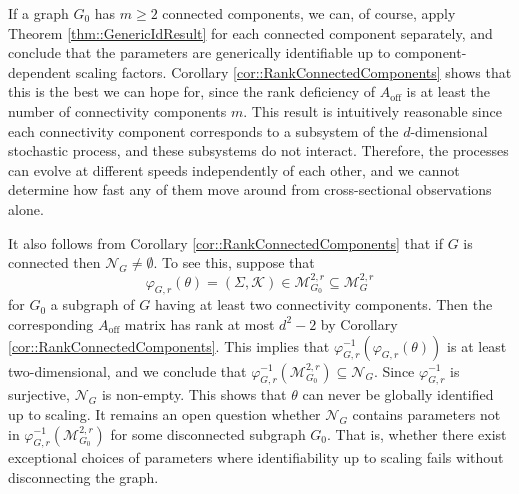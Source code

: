 \documentclass{biometrika}
\begin{document}
If a graph $G_0$ has $m \geq 2$ connected components, we can, of course,  
apply Theorem \ref{thm::GenericIdResult} for each connected component separately, 
and conclude that the parameters are generically identifiable up to component-dependent 
scaling factors. Corollary \ref{cor::RankConnectedComponents} shows that this is the 
best we can hope for, since the rank deficiency of $A_{\mathrm{off}}$ is at least the 
number of connectivity components $m$. This result is intuitively reasonable since 
each connectivity component corresponds to a subsystem of the $d$-dimensional stochastic process,
and these subsystems do not interact. Therefore, the processes can evolve
at different speeds independently of each other, and we cannot determine how fast
any of them move around from cross-sectional observations alone. 

It also follows from Corollary \ref{cor::RankConnectedComponents} that 
if $G$ is connected then $\mathcal{N}_G \neq \emptyset$. To see this, suppose that 
$$\varphi_{G,r}(\theta) = (\Sigma, \mathcal{K} ) \in \mathcal{M}^{2,r}_{G_0} \subseteq \mathcal{M}^{2,r}_{G}$$ 
for $G_0$ a subgraph of $G$ having at least two connectivity components. Then the 
corresponding $A_{\mathrm{off}}$ matrix has rank at most $d^2 - 2$ by Corollary \ref{cor::RankConnectedComponents}. This implies that $\varphi^{-1}_{G, r}(\varphi_{G,r}(\theta))$
is at least two-dimensional, and we conclude that $\varphi^{-1}_{G, r}(\mathcal{M}^{2,r}_{G_0}) \subseteq \mathcal{N}_G$. Since $\varphi^{-1}_{G, r}$ is surjective, $\mathcal{N}_G$ is non-empty. This 
shows that $\theta$ can never be globally identified up to scaling. It remains an open 
question whether $\mathcal{N}_G$ contains parameters not in 
$\varphi^{-1}_{G, r}(\mathcal{M}^{2,r}_{G_0})$ for some disconnected subgraph $G_0$. 
That is, whether there exist exceptional choices of parameters where identifiability up to scaling fails without disconnecting the graph.









\end{document}
